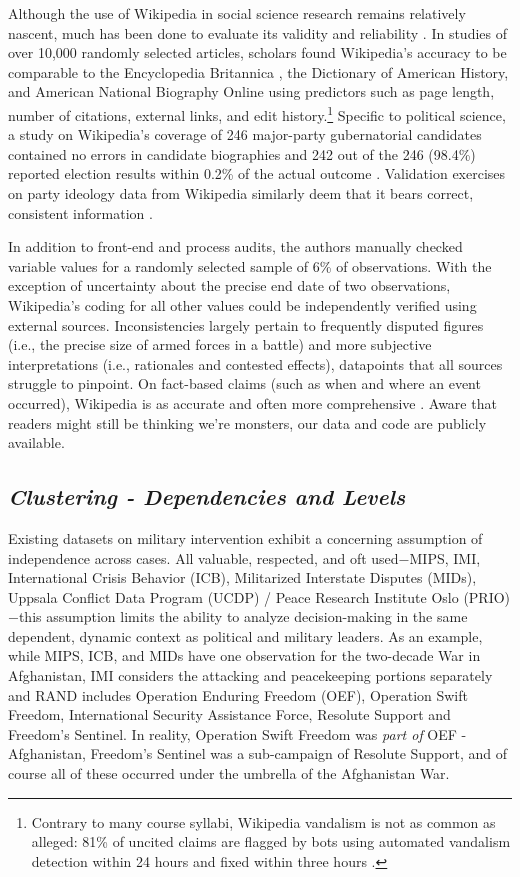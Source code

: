 \documentclass[fleqn,12pt]{article}
\begin{document}
Although the use of Wikipedia in social science research remains relatively nascent, much has been done to evaluate its validity and reliability \citep{GreensteinZhu12,Mesgari15,BenjakobAviram18}. In studies of over 10,000 randomly selected articles, scholars found Wikipedia’s accuracy to be comparable to the Encyclopedia Britannica \citep{Blumenstock08}, the Dictionary of American History, and American National Biography Online \citep{Rector08} using predictors such as page length, number of citations, external links, and edit history.\footnote{Contrary to many course syllabi, Wikipedia vandalism is not as common as alleged: 81\% of uncited claims are flagged by bots using automated vandalism detection within 24 hours and fixed within three hours \citep{Adler11,Tramullas16}.} Specific to political science, a study on Wikipedia’s coverage of 246 major-party gubernatorial candidates contained no errors in candidate biographies and 242 out of the 246 (98.4\%) reported election results within 0.2\% of the actual outcome \citep{Brown11}. Validation exercises on party ideology data from Wikipedia similarly deem that it bears correct, consistent information \citep{GobelMunzert21, HerrmannDoring21}.

In addition to front-end and process audits, the authors manually checked variable values for a randomly selected sample of 6\% of observations. With the exception of uncertainty about the precise end date of two observations, Wikipedia's coding for all other values could be independently verified using external sources. Inconsistencies largely pertain to frequently disputed figures (i.e., the precise size of armed forces in a battle) and more subjective interpretations (i.e., rationales and contested effects), datapoints that all sources struggle to pinpoint. On fact-based claims (such as when and where an event occurred), Wikipedia is as accurate and often more comprehensive \citep{Rector08}. Aware that readers might still be thinking we're monsters, our data and code are publicly available.

\subsection*{\textit{Clustering - Dependencies and Levels}}
Existing datasets on military intervention exhibit a concerning assumption of independence across cases. All valuable, respected, and oft used$-$MIPS, IMI, International Crisis Behavior (ICB), Militarized Interstate Disputes (MIDs), Uppsala Conflict Data Program (UCDP) / Peace Research Institute Oslo (PRIO) $-$this assumption limits the ability to analyze decision-making in the same dependent, dynamic context as political and military leaders. As an example, while MIPS, ICB, and MIDs have one observation for the two-decade War in Afghanistan, IMI considers the attacking and peacekeeping portions separately and RAND includes Operation Enduring Freedom (OEF), Operation Swift Freedom, International Security Assistance Force, Resolute Support and Freedom's Sentinel. In reality, Operation Swift Freedom was \textit{part of} OEF - Afghanistan, Freedom's Sentinel was a sub-campaign of Resolute Support, and of course all of these occurred under the umbrella of the Afghanistan War.
\end{document}

